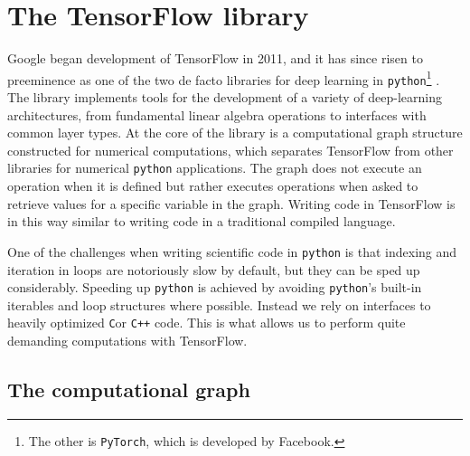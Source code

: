 \section{The TensorFlow library}\label{sec:TensorFlow}

Google began development of TensorFlow in 2011, and it has since risen to preeminence as one of the two de facto libraries for deep learning in \lstinline{python}\footnote{The other is \lstinline{PyTorch}, which is developed by Facebook.} \cite{tensorflow}. The library implements tools for the development of a variety of deep-learning architectures, from fundamental linear algebra operations to interfaces with common layer types. At the core of the library is a computational graph structure constructed for numerical computations, which separates TensorFlow from other libraries for numerical \lstinline{python} applications. The graph does not execute an operation when it is defined but rather executes operations when asked to retrieve values for a specific variable in the graph. Writing code in TensorFlow is in this way similar to writing code in a traditional compiled language.

One of the challenges when writing scientific code in \lstinline{python} is that indexing and iteration in loops are notoriously slow by default, but they can be sped up considerably. Speeding up \lstinline{python} is achieved by avoiding \lstinline{python}'s built-in iterables and loop structures where possible. Instead we rely on interfaces to heavily optimized \lstinline{C}or \lstinline{C++} code. This is what allows us to perform quite demanding computations with TensorFlow.

\subsection{The computational graph}

